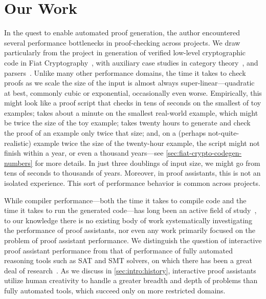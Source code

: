 \section{Our Work}\label{sec:problem}

In the quest to enable automated proof generation, the author encountered several performance bottlenecks in proof-checking across projects.
We draw particularly from the project in generation of verified low-level cryptographic code in Fiat Cryptography~\cite{FiatCryptoSP19}, with auxiliary case studies in category theory~\cite{category-coq-experience}, and parsers~\cite{jgross-masters-thesis}.
\label{sec:first-fiat-crypto}%
Unlike many other performance domains, the time it takes to check proofs as we scale the size of the input is almost always super-linear---quadratic at best, commonly cubic or exponential, occasionally even worse.
Empirically, this might look like a proof script that checks in tens of seconds on the smallest of toy examples; takes about a minute on the smallest real-world example, which might be twice the size of the toy example; takes twenty hours to generate and check the proof of an example only twice that size; and, on a (perhaps not-quite-realistic) example twice the size of the twenty-hour example, the script might not finish within a year, or even a thousand years---see \autoref{sec:fiat-crypto-codegen-numbers} for more details.
In just three doublings of input size, we might go from tens of seconds to thousands of years.
Moreover, in proof assistants, this is not an isolated experience.
This sort of performance behavior is common across projects.

While compiler performance---both the time it takes to compile code and the time it takes to run the generated code---has long been an active field of study~\cite{CC++Performance2017,georges2007statistically,mytkowicz-wrong-data}, to our knowledge there is no existing body of work systematically investigating the performance of proof assistants, nor even any work primarily focused on the problem of proof assistant performance.
We distinguish the question of interactive proof assistant performance from that of performance of fully automated reasoning tools such as SAT and SMT solvers, on which there has been a great deal of research~\cite{Efficiency1994Boulton}.
As we discuss in \autoref{sec:intro:history}, interactive proof assistants utilize human creativity to handle a greater breadth and depth of problems than fully automated tools, which succeed only on more restricted domains.

